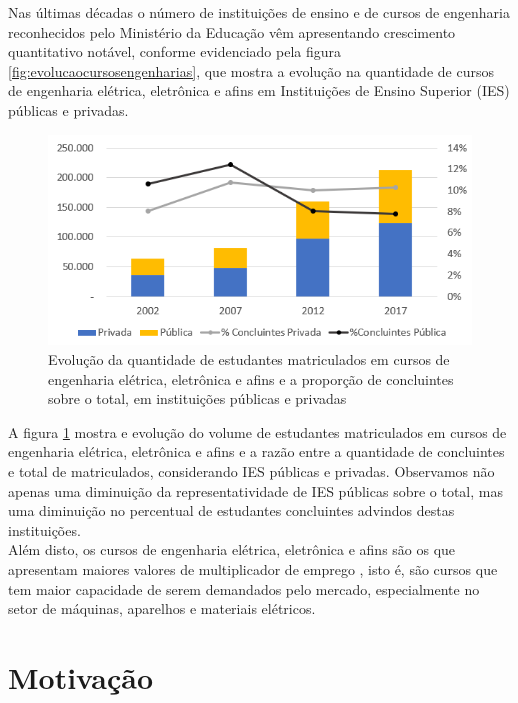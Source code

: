	Nas últimas décadas o número de instituições de ensino e de cursos de engenharia reconhecidos pelo Ministério da Educação vêm apresentando crescimento quantitativo notável, conforme evidenciado pela figura \ref{fig:evolucaocursosengenharias}, que mostra a evolução na quantidade de cursos de engenharia elétrica, eletrônica e afins em Instituições de Ensino Superior (IES) públicas e privadas.\\
	
	\begin{figure}[h!]
		\centering
		\includegraphics[width=0.8\linewidth]{Figuras/evolucao_matriculados_concluintes}
		\caption[Evolução de matriculados em cursos de engenharia elétrica, eletrônica e afins]{Evolução da quantidade de estudantes matriculados em cursos de engenharia elétrica, eletrônica e afins e a proporção de concluintes sobre o total, em instituições públicas e privadas \cite{censo_educacao_superior}}
		\label{fig:evolucaomatriculadosconcluintes}
	\end{figure}
	
	A figura \ref{fig:evolucaomatriculadosconcluintes} mostra e evolução do volume de estudantes matriculados em cursos de engenharia elétrica, eletrônica e afins e a razão entre a quantidade de concluintes e total de matriculados, considerando IES públicas e privadas. Observamos não apenas uma diminuição da representatividade de IES públicas sobre o total, mas uma diminuição no percentual de estudantes concluintes advindos destas instituições.\\
	
	Além disto, os cursos de engenharia elétrica, eletrônica e afins são os que apresentam maiores valores de multiplicador de emprego \cite{demanda_engenheiros}, isto é, são cursos que tem maior capacidade de serem demandados pelo mercado, especialmente no setor de máquinas, aparelhos e materiais elétricos.
	
	\section{Motivação}
	
